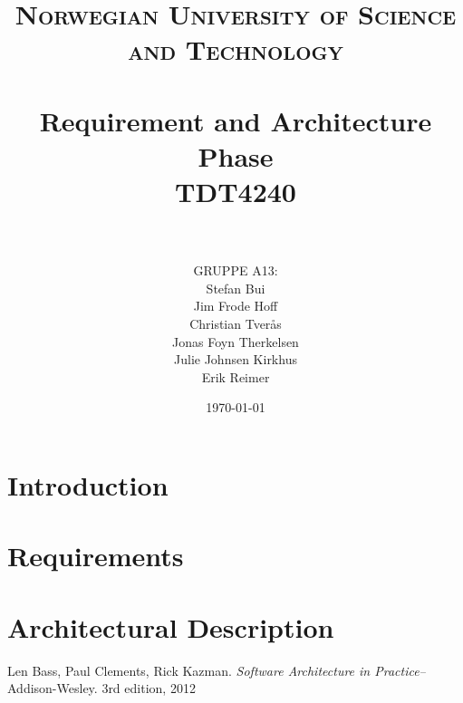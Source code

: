\documentclass[paper=a4, fontsize=11pt]{scrartcl} %
\title{ 
\normalfont \normalsize 
\textsc{Norwegian University of Science and Technology} \\ [25pt] %
\horrule{0.5pt} \\[0.4cm] %
\huge \textbf{Requirement and Architecture Phase} \\ %
TDT4240 \\
\horrule{2pt} \\[0.5cm] %
}
\author{GRUPPE A13:\\Stefan Bui\\Jim Frode Hoff\\Christian Tverås\\Jonas Foyn Therkelsen\\Julie Johnsen Kirkhus\\Erik Reimer}
\date{\normalsize \today}
\numberwithin{equation}{section} %
\numberwithin{figure}{section} %
\numberwithin{table}{section} %
\begin{document}

\maketitle

\thispagestyle{firststyle}

\newpage

\renewcommand*\contentsname{Innhold}
\tableofcontents

\setcounter{secnumdepth}{3}

\newpage


\section{Introduction}

\newpage


\section{Requirements}

\newpage

\section{Architectural Description}

\newpage


\begin{thebibliography}{9}
	Len Bass, Paul Clements, Rick Kazman.
	\emph{Software Architecture in Practice–}
	Addison-Wesley.
	3rd edition,
	2012
\end{thebibliography}
\end{document}
